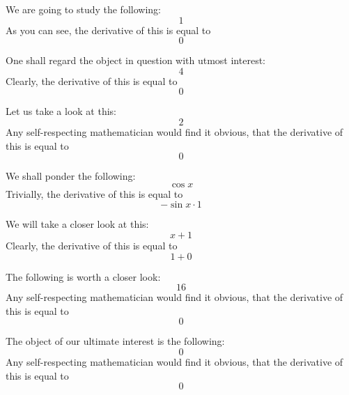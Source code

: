 \documentclass{article}
\begin{document}
We are going to study the following:
\begin{equation}
1 
\end{equation}
As you can see, the derivative of this is equal to
\begin{equation}
0 
\end{equation}

One shall regard the object in question with utmost interest:
\begin{equation}
4 
\end{equation}
Clearly, the derivative of this is equal to
\begin{equation}
0 
\end{equation}

Let us take a look at this:
\begin{equation}
2 
\end{equation}
Any self-respecting mathematician would find it obvious, that the derivative of this is equal to
\begin{equation}
0 
\end{equation}

We shall ponder the following:
\begin{equation}
\cos x 
\end{equation}
Trivially, the derivative of this is equal to
\begin{equation}
-\sin x \cdot 1 
\end{equation}

We will take a closer look at this:
\begin{equation}
x + 1 
\end{equation}
Clearly, the derivative of this is equal to
\begin{equation}
1 + 0 
\end{equation}

The following is worth a closer look:
\begin{equation}
16 
\end{equation}
Any self-respecting mathematician would find it obvious, that the derivative of this is equal to
\begin{equation}
0 
\end{equation}

The object of our ultimate interest is the following:
\begin{equation}
0 
\end{equation}
Any self-respecting mathematician would find it obvious, that the derivative of this is equal to
\begin{equation}
0 
\end{equation}
\end{document}

